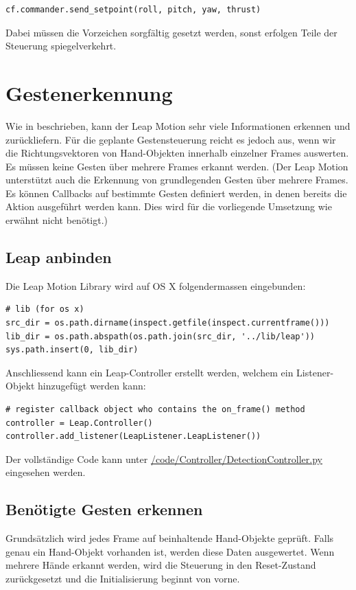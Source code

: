 \begin{lstlisting}[style=lstStyleCpp]
cf.commander.send_setpoint(roll, pitch, yaw, thrust)
\end{lstlisting}

Dabei müssen die Vorzeichen sorgfältig gesetzt werden, sonst erfolgen Teile der Steuerung spiegelverkehrt.


\section{Gestenerkennung}
Wie in  beschrieben, kann der Leap Motion sehr viele Informationen erkennen und zurückliefern.
Für die geplante Gestensteuerung reicht es jedoch aus, wenn wir die Richtungsvektoren von Hand-Objekten innerhalb einzelner Frames auswerten.
Es müssen keine Gesten über mehrere Frames erkannt werden. (Der Leap Motion unterstützt auch die Erkennung von grundlegenden Gesten über mehrere Frames. Es können Callbacks auf bestimmte Gesten definiert werden, in denen bereits die Aktion ausgeführt werden kann. Dies wird für die vorliegende Umsetzung wie erwähnt nicht benötigt.)

\subsection{Leap anbinden}
Die Leap Motion Library wird auf OS X folgendermassen eingebunden:
\begin{lstlisting}[style=lstStyleCpp]
# lib (for os x)
src_dir = os.path.dirname(inspect.getfile(inspect.currentframe()))
lib_dir = os.path.abspath(os.path.join(src_dir, '../lib/leap'))
sys.path.insert(0, lib_dir)
\end{lstlisting}

Anschliessend kann ein Leap-Controller erstellt werden, welchem ein Listener-Objekt hinzugefügt werden kann:
\begin{lstlisting}[style=lstStyleCpp]
# register callback object who contains the on_frame() method
controller = Leap.Controller()
controller.add_listener(LeapListener.LeapListener())
\end{lstlisting}

Der vollständige Code kann unter \href{https://github.com/MrJack91/droneGestures/blob/master/code/Controller/DetectionController.py}{/code/Controller/DetectionController.py} eingesehen werden.

\subsection{Benötigte Gesten erkennen}
Grundsätzlich wird jedes Frame auf beinhaltende Hand-Objekte geprüft.
Falls genau ein Hand-Objekt vorhanden ist, werden diese Daten ausgewertet. Wenn mehrere Hände erkannt werden, wird die Steuerung in den Reset-Zustand zurückgesetzt und die Initialisierung beginnt von vorne.

